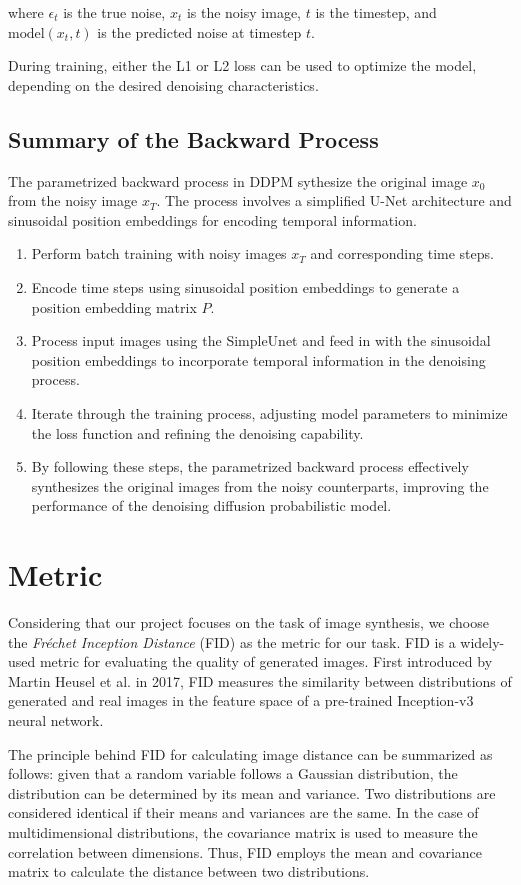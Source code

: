 \documentclass[letterpaper]{article} %
\begin{document}
\noindent where $\epsilon_t$ is the true noise, $x_t$ is the noisy image, $t$ is the timestep, and $\text{model}(x_t, t)$ is the predicted noise at timestep $t$.

During training, either the L1 or L2 loss can be used to optimize the model, depending on the desired denoising characteristics.

\subsection{Summary of the Backward Process}
The parametrized backward process in DDPM sythesize the original image $x_0$ from the noisy image $x_T$. The process involves a simplified U-Net architecture and sinusoidal position embeddings for encoding temporal information.
\begin{enumerate}
\item Perform batch training with noisy images $x_T$ and corresponding time steps.
\item Encode time steps using sinusoidal position embeddings to generate a position embedding matrix $P$.
\item Process input images using the SimpleUnet and feed in with the sinusoidal position embeddings to incorporate temporal information in the denoising process.
\item Iterate through the training process, adjusting model parameters to minimize the loss function and refining the denoising capability.
\item By following these steps, the parametrized backward process effectively synthesizes the original images from the noisy counterparts, improving the performance of the denoising diffusion probabilistic model.
\end{enumerate}

\section{Metric}
Considering that our project focuses on the task of image synthesis, we choose the \textit{Fréchet Inception Distance} (FID) as the metric for our task. FID is a widely-used metric for evaluating the quality of generated images. First introduced by Martin Heusel et al. in 2017, FID measures the similarity between distributions of generated and real images in the feature space of a pre-trained Inception-v3 neural network.

The principle behind FID for calculating image distance can be summarized as follows: given that a random variable follows a Gaussian distribution, the distribution can be determined by its mean and variance. Two distributions are considered identical if their means and variances are the same. In the case of multidimensional distributions, the covariance matrix is used to measure the correlation between dimensions. Thus, FID employs the mean and covariance matrix to calculate the distance between two distributions.
\end{document}

